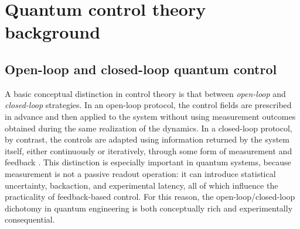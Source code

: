 \section{Quantum control theory background}
\subsection{Open-loop and closed-loop quantum control}
\label{subsec:open_closed_loop_control}

A basic conceptual distinction in control theory is that between \emph{open-loop} and \emph{closed-loop} strategies. In an open-loop protocol, the control fields are prescribed in advance and then applied to the system without using measurement outcomes obtained during the same realization of the dynamics. In a closed-loop protocol, by contrast, the controls are adapted using information returned by the system itself, either continuously or iteratively, through some form of measurement and feedback \cite{Koch2022,Ferrie2015,Feng2018}. This distinction is especially important in quantum systems, because measurement is not a passive readout operation: it can introduce statistical uncertainty, backaction, and experimental latency, all of which influence the practicality of feedback-based control. For this reason, the open-loop/closed-loop dichotomy in quantum engineering is both conceptually rich and experimentally consequential.

